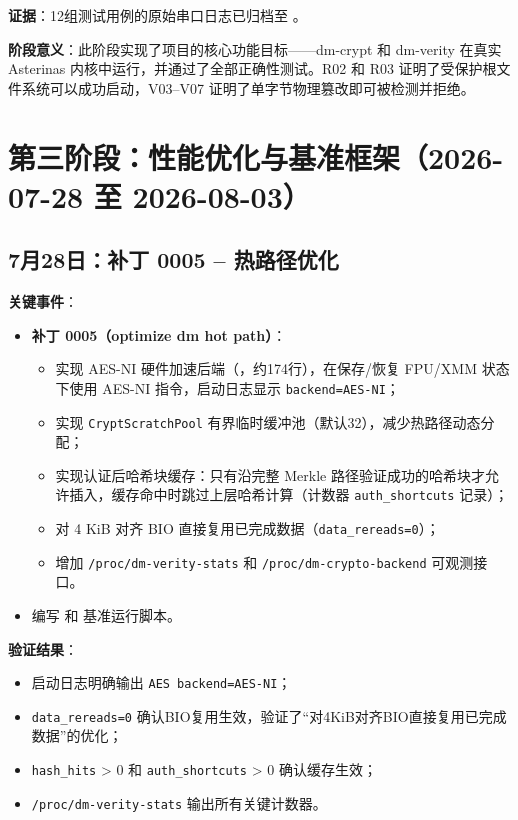 \textbf{证据}：12组测试用例的原始串口日志已归档至 \texttt{}。

\textbf{阶段意义}：此阶段实现了项目的核心功能目标——dm-crypt 和 dm-verity 在真实 Asterinas 内核中运行，并通过了全部正确性测试。R02 和 R03 证明了受保护根文件系统可以成功启动，V03--V07 证明了单字节物理篡改即可被检测并拒绝。

\section{第三阶段：性能优化与基准框架（2026-07-28 至 2026-08-03）}

\subsection{7月28日：补丁 0005 -- 热路径优化}

\textbf{关键事件}：
\begin{itemize}
    \item \textbf{补丁 0005（optimize dm hot path）}：
    \begin{itemize}
        \item 实现 AES-NI 硬件加速后端（\texttt{}，约174行），在保存/恢复 FPU/XMM 状态下使用 AES-NI 指令，启动日志显示 \texttt{backend=AES-NI}；
        \item 实现 \texttt{CryptScratchPool} 有界临时缓冲池（默认32），减少热路径动态分配；
        \item 实现认证后哈希块缓存：只有沿完整 Merkle 路径验证成功的哈希块才允许插入，缓存命中时跳过上层哈希计算（计数器 \texttt{auth\_shortcuts} 记录）；
        \item 对 4 KiB 对齐 BIO 直接复用已完成数据（\texttt{data\_rereads=0}）；
        \item 增加 \texttt{/proc/dm-verity-stats} 和 \texttt{/proc/dm-crypto-backend} 可观测接口。
    \end{itemize}
    \item 编写 \texttt{} 和 \texttt{} 基准运行脚本。
\end{itemize}

\textbf{验证结果}：
\begin{itemize}
    \item 启动日志明确输出 \texttt{AES backend=AES-NI}；
    \item \texttt{data\_rereads=0} 确认BIO复用生效，验证了“对4KiB对齐BIO直接复用已完成数据”的优化；
    \item \texttt{hash\_hits} > 0 和 \texttt{auth\_shortcuts} > 0 确认缓存生效；
    \item \texttt{/proc/dm-verity-stats} 输出所有关键计数器。
\end{itemize}

